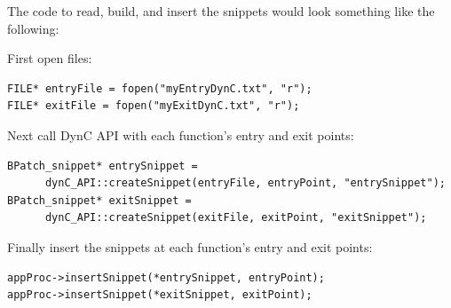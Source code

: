
\noindent The code to read, build, and insert the snippets would look something like the following:

\noindent First open files:
\begin{lstlisting}
FILE* entryFile = fopen("myEntryDynC.txt", "r");
FILE* exitFile = fopen("myExitDynC.txt", "r");
\end{lstlisting}

\noindent Next call DynC API with each function's entry and exit points:
\begin{lstlisting}
BPatch_snippet* entrySnippet =
      dynC_API::createSnippet(entryFile, entryPoint, "entrySnippet");
BPatch_snippet* exitSnippet =
      dynC_API::createSnippet(exitFile, exitPoint, "exitSnippet");
\end{lstlisting}

\noindent Finally insert the snippets at each function's entry and exit points:
\begin{lstlisting}
appProc->insertSnippet(*entrySnippet, entryPoint);
appProc->insertSnippet(*exitSnippet, exitPoint);
\end{lstlisting}

